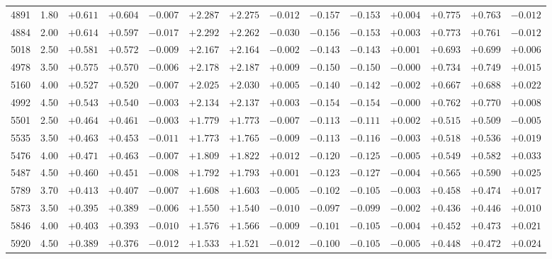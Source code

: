 \documentclass[]{aa}
\begin{document}
\begin{appendix}
\begin{table*}
\begin{center}
\begin{tabular}{llllllllllllll}
4891  &1.80 &$ +0.611$ &$ +0.604$ &$ -0.007$ &$ +2.287$ &$ +2.275$ &$ -0.012$ &$ -0.157$ &$ -0.153$ &$ +0.004$ &$ +0.775$ &$ +0.763$ &$ -0.012$\\
4884  &2.00 &$ +0.614$ &$ +0.597$ &$ -0.017$ &$ +2.292$ &$ +2.262$ &$ -0.030$ &$ -0.156$ &$ -0.153$ &$ +0.003$ &$ +0.773$ &$ +0.761$ &$ -0.012$\\
5018  &2.50 &$ +0.581$ &$ +0.572$ &$ -0.009$ &$ +2.167$ &$ +2.164$ &$ -0.002$ &$ -0.143$ &$ -0.143$ &$ +0.001$ &$ +0.693$ &$ +0.699$ &$ +0.006$\\
4978  &3.50 &$ +0.575$ &$ +0.570$ &$ -0.006$ &$ +2.178$ &$ +2.187$ &$ +0.009$ &$ -0.150$ &$ -0.150$ &$ -0.000$ &$ +0.734$ &$ +0.749$ &$ +0.015$\\
5160  &4.00 &$ +0.527$ &$ +0.520$ &$ -0.007$ &$ +2.025$ &$ +2.030$ &$ +0.005$ &$ -0.140$ &$ -0.142$ &$ -0.002$ &$ +0.667$ &$ +0.688$ &$ +0.022$\\
4992  &4.50 &$ +0.543$ &$ +0.540$ &$ -0.003$ &$ +2.134$ &$ +2.137$ &$ +0.003$ &$ -0.154$ &$ -0.154$ &$ -0.000$ &$ +0.762$ &$ +0.770$ &$ +0.008$\\
5501  &2.50 &$ +0.464$ &$ +0.461$ &$ -0.003$ &$ +1.779$ &$ +1.773$ &$ -0.007$ &$ -0.113$ &$ -0.111$ &$ +0.002$ &$ +0.515$ &$ +0.509$ &$ -0.005$\\
5535  &3.50 &$ +0.463$ &$ +0.453$ &$ -0.011$ &$ +1.773$ &$ +1.765$ &$ -0.009$ &$ -0.113$ &$ -0.116$ &$ -0.003$ &$ +0.518$ &$ +0.536$ &$ +0.019$\\
5476  &4.00 &$ +0.471$ &$ +0.463$ &$ -0.007$ &$ +1.809$ &$ +1.822$ &$ +0.012$ &$ -0.120$ &$ -0.125$ &$ -0.005$ &$ +0.549$ &$ +0.582$ &$ +0.033$\\
5487  &4.50 &$ +0.460$ &$ +0.451$ &$ -0.008$ &$ +1.792$ &$ +1.793$ &$ +0.001$ &$ -0.123$ &$ -0.127$ &$ -0.004$ &$ +0.565$ &$ +0.590$ &$ +0.025$\\
5789  &3.70 &$ +0.413$ &$ +0.407$ &$ -0.007$ &$ +1.608$ &$ +1.603$ &$ -0.005$ &$ -0.102$ &$ -0.105$ &$ -0.003$ &$ +0.458$ &$ +0.474$ &$ +0.017$\\
5873  &3.50 &$ +0.395$ &$ +0.389$ &$ -0.006$ &$ +1.550$ &$ +1.540$ &$ -0.010$ &$ -0.097$ &$ -0.099$ &$ -0.002$ &$ +0.436$ &$ +0.446$ &$ +0.010$\\
5846  &4.00 &$ +0.403$ &$ +0.393$ &$ -0.010$ &$ +1.576$ &$ +1.566$ &$ -0.009$ &$ -0.101$ &$ -0.105$ &$ -0.004$ &$ +0.452$ &$ +0.473$ &$ +0.021$\\
5920  &4.50 &$ +0.389$ &$ +0.376$ &$ -0.012$ &$ +1.533$ &$ +1.521$ &$ -0.012$ &$ -0.100$ &$ -0.105$ &$ -0.005$ &$ +0.448$ &$ +0.472$ &$ +0.024$\\

\end{tabular}
\end{center}
\end{table*}
\end{appendix}
\end{document}
